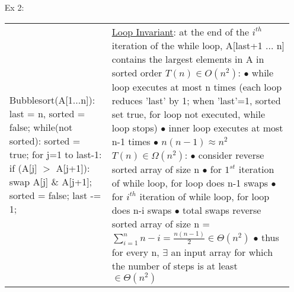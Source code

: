 \documentclass[11pt, oneside]{article}
\newcommand\tab[1][0.5cm]{\hspace*{#1}}
\begin{document}
\begin{itemize}
\item [Ex 2:] 
	\begin{tabular}{  l | l  } 
	\makecell[l]{
		Bubblesort(A[1...n]): \\
		last = n, sorted = false; \\
		while(not sorted): \\
		\tab sorted = true; \\
		\tab for j=1 to last-1: \\
		\tab \tab if (A[j] $>$ A[j+1]): \\
		\tab \tab \tab swap A[j] $\&$ A[j+1]; \\
		\tab \tab \tab sorted = false; \\
		\tab last -= 1; \\ }
	&	
	\makecell[l]{ 
		\underline{Loop Invariant}: at the end of the $i^{th}$ iteration of the while loop, \\
		A[last+1 ... n] contains the largest elements in A in sorted order \\ \\
		$T(n) \in O(n^2)$: \\
		\tab $\bullet$ while loop executes at most n times \\
		\tab \tab (each loop reduces 'last' by 1; when 'last'=1, sorted set true, \\
		\tab \tab for loop not executed, while loop stops) \\
		\tab $\bullet$ inner loop executes at most n-1 times \\
		\tab $\bullet$ $n (n-1) \approx n^2 $ \\ \\
		$T(n) \in \Omega(n^2)$: \\
		\tab $\bullet$ consider reverse sorted array of size n \\
		\tab $\bullet$ for $1^{st}$ iteration of while loop, for loop does n-1 swaps \\ 
		\tab $\bullet$ for $i^{th}$ iteration of while loop, for loop does n-i swaps \\ 
		\tab $\bullet$ total swaps reverse sorted array of size n = $\sum_{i=1}^{n} n-i = \frac{n(n-1)}{2} \in \Theta(n^2)$ \\
		\tab $\bullet$ thus for every n, $\exists$ an input array for which the number of steps is \\
		\tab \tab at least $\in \Theta(n^2)$} 
	\end{tabular}

\end{itemize}
\end{document}

